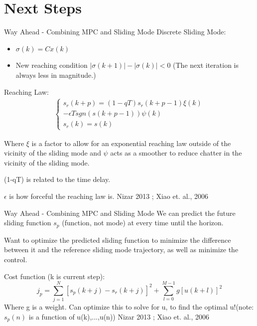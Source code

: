 \documentclass[aspectratio=169]{beamer}
\begin{document}
\section{Next Steps}
\begin{frame}{Way Ahead - Combining MPC and Sliding Mode}
    Discrete Sliding Mode:
    \begin{itemize}
        \item $\sigma(k)=Cx(k)$
        \item New reaching condition $|\sigma(k+1)|-|\sigma(k)|<0$ (The next iteration is always less in magnitude.)
    \end{itemize}
    Reaching Law:
    \begin{align*}
        \begin{cases}
           s_r(k+p)=(1-qT)s_r(k+p-1)\xi(k)\\
            -\epsilon Tsgn(s(k+p-1))\psi(k)\\
            s_r(k)=s(k)
        \end{cases}
    \end{align*}
    
    
    Where $\xi$ is a factor to allow for an exponential reaching law outside of the vicinity of the sliding mode and $\psi$ acts as a smoother to reduce chatter in the vicinity of the sliding mode.
    
    (1-qT) is related to the time delay.
    
    $\epsilon$ is how forceful the reaching law is.\break
    \break
    Nizar 2013 \cite{NizarMPCSMC}; Xiao et. al., 2006 \cite{XiaoMPCSMC}
\end{frame}
\begin{frame}{Way Ahead - Combining MPC and Sliding Mode}
    We can predict the future sliding function $s_p$ (function, not mode) at every time until the horizon.
    \break
    
    Want to optimize the predicted sliding function to minimize the difference between it and the reference sliding mode trajectory, as well as minimize the control.\break
    
    Cost function (k is current step):
    $$j_p=\sum\limits_{j=1}^{N}[s_p(k+j)-s_r(k+j)]^2+\sum\limits_{l=0}^{M-1}g[u(k+l)]^2$$
    Where g is a weight.\break
    Can optimize this to solve for u, to find the optimal u!\break (note: $s_p(n)$ is a function of u(k),...,u(n)) \break
    \break
    Nizar 2013 \cite{NizarMPCSMC}; Xiao et. al., 2006 \cite{XiaoMPCSMC}
\end{frame}
\end{document}
